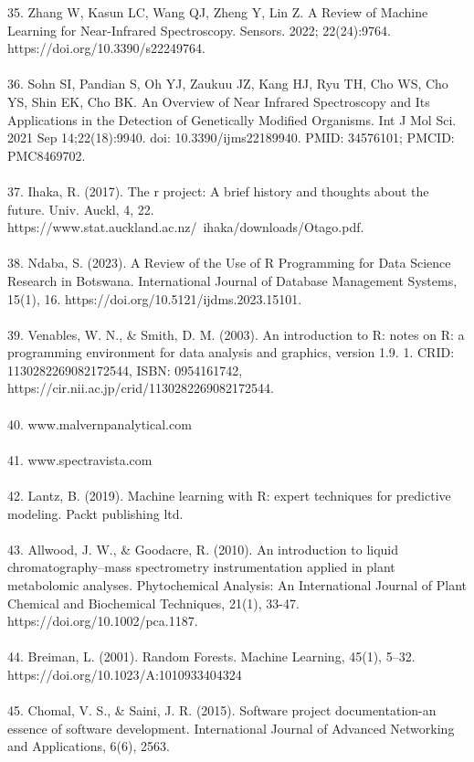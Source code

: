 \documentclass[12pt,a4paper]{report}
\begin{document}
35. Zhang W, Kasun LC, Wang QJ, Zheng Y, Lin Z. A Review of Machine Learning for Near-Infrared Spectroscopy. Sensors. 2022; 22(24):9764. https://doi.org/10.3390/s22249764. \\
\\
36. Sohn SI, Pandian S, Oh YJ, Zaukuu JZ, Kang HJ, Ryu TH, Cho WS, Cho YS, Shin EK, Cho BK. An Overview of Near Infrared Spectroscopy and Its Applications in the Detection of Genetically Modified Organisms. Int J Mol Sci. 2021 Sep 14;22(18):9940. doi: 10.3390/ijms22189940. PMID: 34576101; PMCID: PMC8469702.\\
\\
37. Ihaka, R. (2017). The r project: A brief history and thoughts about the future. Univ. Auckl, 4, 22. https://www.stat.auckland.ac.nz/~ihaka/downloads/Otago.pdf. \\
\\
38. Ndaba, S. (2023). A Review of the Use of R Programming for Data Science Research in Botswana. International Journal of Database Management Systems, 15(1), 16. https://doi.org/10.5121/ijdms.2023.15101. \\
\\
39. Venables, W. N., \& Smith, D. M. (2003). An introduction to R: notes on R: a programming environment for data analysis and graphics, version 1.9. 1. CRID: 1130282269082172544, ISBN: 0954161742, https://cir.nii.ac.jp/crid/1130282269082172544. \\
\\
40. www.malvernpanalytical.com \\
\\
41. www.spectravista.com \\
\\
42. Lantz, B. (2019). Machine learning with R: expert techniques for predictive modeling. Packt publishing ltd. \\
\\
43. Allwood, J. W., \& Goodacre, R. (2010). An introduction to liquid chromatography–mass spectrometry instrumentation applied in plant metabolomic analyses. Phytochemical Analysis: An International Journal of Plant Chemical and Biochemical Techniques, 21(1), 33-47. https://doi.org/10.1002/pca.1187. \\
\\
44. Breiman, L. (2001). Random Forests. Machine Learning, 45(1), 5–32. https://doi.org/10.1023/A:1010933404324 \\
\\
45. Chomal, V. S., \& Saini, J. R. (2015). Software project documentation-an essence of software development. International Journal of Advanced Networking and Applications, 6(6), 2563.\\
\end{document}
